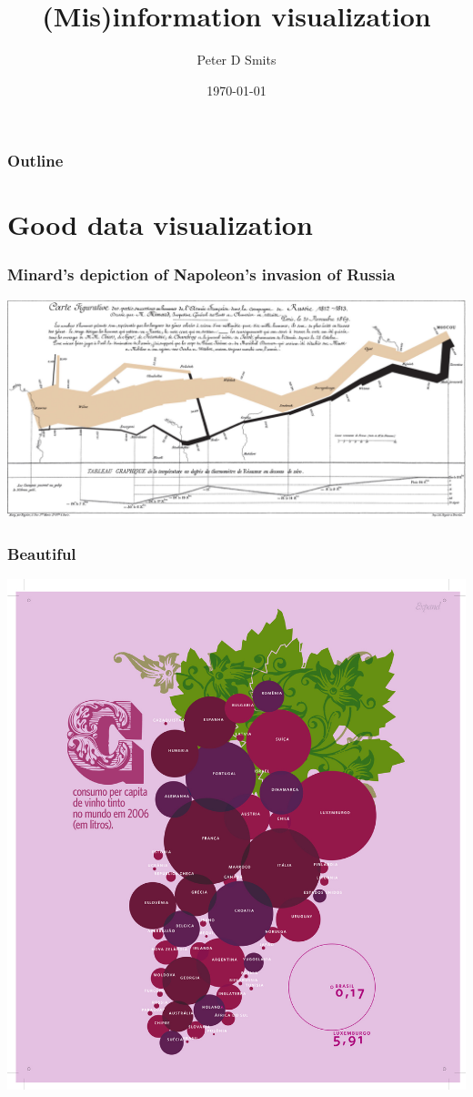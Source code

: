 \documentclass{beamer}
\title{(Mis)information visualization}
\author{Peter D Smits}
\institute{Committee on Evolutionary Biology \\
University of Chicago}
\date{\today}
\begin{document}
\begin{frame}
  \maketitle
\end{frame}

\begin{frame}
  \frametitle{Outline}
  \tableofcontents
\end{frame}

\section{Good data visualization}
\begin{frame}
  \frametitle{Minard's depiction of Napoleon's invasion of Russia}
  \includegraphics[width = \textwidth, keepaspectratio = true]{figure/minard}
\end{frame}

\begin{frame}
  \frametitle{Beautiful}
  \begin{center}
    \includegraphics[height = 0.9\textheight, keepaspectratio = true]{figure/wine_consumption_2006}
  \end{center}
\end{frame}
\end{document}
